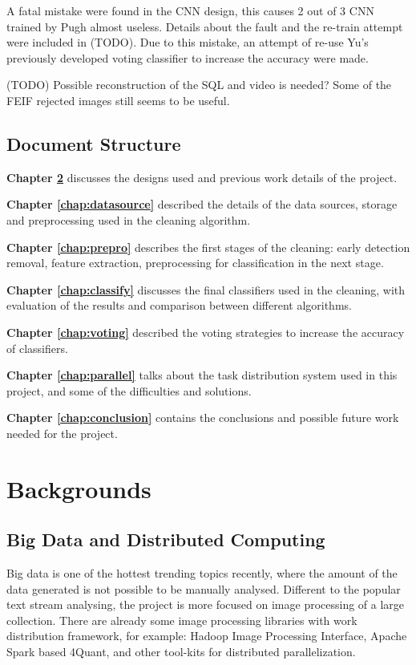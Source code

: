 \documentclass[bsc,logo,twoside,fullspacing,parskip]{infthesis}
\begin{document}
A fatal mistake were found in the CNN design, this causes 2 out of 3 CNN trained by Pugh almost useless. Details about the fault and the re-train attempt were included in (TODO).
Due to this mistake, an attempt of re-use Yu's previously developed voting classifier to increase the accuracy were made. 

(TODO) Possible reconstruction of the SQL and video is needed? Some of the FEIF rejected images still seems to be useful.

\section{Document Structure}

\textbf{Chapter \ref{chap:bg}} discusses the designs used and previous work details of the project. 

\textbf{Chapter \ref{chap:datasource}} described the details of the data sources, storage and preprocessing used in the cleaning algorithm.

\textbf{Chapter \ref{chap:prepro}} describes the first stages of the cleaning: early detection removal, feature extraction, preprocessing for classification in the next stage.

\textbf{Chapter \ref{chap:classify}} discusses the final classifiers used in the cleaning, with evaluation of the results and comparison between different algorithms. 

\textbf{Chapter \ref{chap:voting}} described the voting strategies to increase the accuracy of classifiers.

\textbf{Chapter \ref{chap:parallel}} talks about the task distribution system used in this project, and some of the difficulties and solutions.

\textbf{Chapter \ref{chap:conclusion}} contains the conclusions and possible future work needed for the project.
\newpage


\chapter{Backgrounds}
\label{chap:bg}

\section{Big Data and Distributed Computing}

Big data is one of the hottest trending topics recently, where the amount of the data generated is not possible to be manually analysed. 
Different to the popular text stream analysing, the project is more focused on image processing of a large collection. 
There are already some image processing libraries with work distribution framework, for example: Hadoop Image Processing Interface\cite{L3}, Apache Spark based 4Quant\cite{L4}, and other tool-kits for distributed parallelization.
\end{document}
